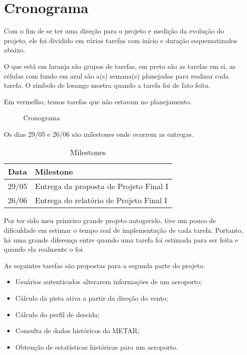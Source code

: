 \chapter{Cronograma}

Com o fim de se ter uma direção para o projeto e medição da evolução do projeto, ele foi dividido 
em várias tarefas com início e duração esquematizados abaixo.

O que está em laranja são grupos de tarefas, em preto são as tarefas em si, as células com fundo 
em azul são a(s) semana(s) planejadas para realizar cada tarefa. O símbolo de losango mostra 
quando a tarefa foi de fato feita.

Em vermelho, temos tarefas que não estavam no planejamento.

\begin{figure}[ht]
    \begin{center}
    
    \caption{Cronograma}
    \label{fig:cronograma-planejado}
    \end{center}
\end{figure}

Os dias 29/05 e 26/06 são milestones onde ocorrem as entregas.

\begin{table}[h]
    \centering
    \caption{Milestones}
    \begin{tabular}{|c|l|}
        \hline
        \textbf{Data} & \textbf{Milestone} \\
        \hline
        29/05 & Entrega da proposta de Projeto Final I \\
        26/06 & Entrega do relatório de Projeto Final I \\
        \hline
    \end{tabular}
\end{table}

Por ter sido meu primeiro grande projeto autogerido, tive um pouco de dificuldade em estimar o tempo real 
de implementação de cada tarefa. Portanto, há uma grande diferença entre quando uma tarefa foi estimada 
para ser feita e quando ela realmente o foi.

As seguintes tarefas são propostas para a segunda parte do projeto.

\begin{itemize}
    \item Usuários autenticados alterarem informações de um aeroporto;
    \item Cálculo da pista ativa a partir da direção do vento;
    \item Cálculo do perfil de descida;
    \item Consulta de dados históricos do METAR;
    \item Obtenção de estatísticas históricas para um aeroporto.
\end{itemize}
